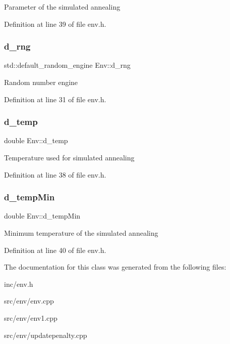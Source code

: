 Parameter of the simulated annealing 

Definition at line 39 of file env.\+h.

\mbox{\label{class_env_acde21783d6aed785a78cf914a7215383}} 
\subsubsection{\texorpdfstring{d\+\_\+rng}{d\_rng}}
{\footnotesize\ttfamily std\+::default\+\_\+random\+\_\+engine Env\+::d\+\_\+rng}

Random number engine 

Definition at line 31 of file env.\+h.

\mbox{\label{class_env_a629686cbb29294979039c2adb9f19f66}} 
\subsubsection{\texorpdfstring{d\+\_\+temp}{d\_temp}}
{\footnotesize\ttfamily double Env\+::d\+\_\+temp}

Temperature used for simulated annealing 

Definition at line 38 of file env.\+h.

\mbox{\label{class_env_a67d0d9d6323ec31b3fa226856afaf93e}} 
\subsubsection{\texorpdfstring{d\+\_\+temp\+Min}{d\_tempMin}}
{\footnotesize\ttfamily double Env\+::d\+\_\+temp\+Min}

Minimum temperature of the simulated annealing 

Definition at line 40 of file env.\+h.



The documentation for this class was generated from the following files\+:\begin{DoxyCompactItemize}
\item 
inc/env.\+h\item 
src/env/env.\+cpp\item 
src/env/env1.\+cpp\item 
src/env/updatepenalty.\+cpp\end{DoxyCompactItemize}
